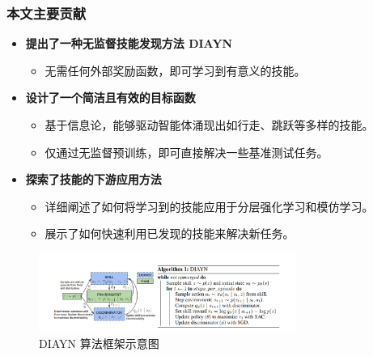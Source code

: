 \documentclass{beamer}
\begin{document}
\begin{frame}
    \frametitle{本文主要贡献 }

    \begin{itemize}
        \item \textbf{提出了一种无监督技能发现方法 DIAYN}
        \begin{itemize}
            \item 无需任何外部奖励函数，即可学习到有意义的技能。
        \end{itemize}
        \vspace{0.3cm}
        
        \item \textbf{设计了一个简洁且有效的目标函数}
        \begin{itemize}
            \item 基于信息论，能够驱动智能体涌现出如行走、跳跃等多样的技能。
            \item 仅通过无监督预训练，即可直接解决一些基准测试任务。
        \end{itemize}
        \vspace{0.3cm}
        
        \item \textbf{探索了技能的下游应用方法}
        \begin{itemize}
            \item 详细阐述了如何将学习到的技能应用于分层强化学习和模仿学习。
            \item 展示了如何快速利用已发现的技能来解决新任务。
        \end{itemize}
    \end{itemize}

    \begin{figure}[htbp] 
        \centering 
        \includegraphics[width=0.75\textwidth]{pic/al1.png}
        \caption{DIAYN 算法框架示意图}
    \end{figure}

\end{frame}
\end{document}
